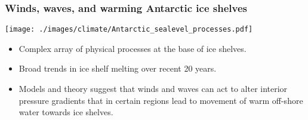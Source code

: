 \documentclass[10pt]{beamer}
\begin{document}
\begin{frame}
  \frametitle{Winds, waves, and warming Antarctic ice shelves}


\begin{center}
\vspace{-.35cm}
{\texttt{[image: ./images/climate/Antarctic\_sealevel\_processes.pdf]}}
\vspace{-0.25cm}
\end{center}

\vspace{-0.25cm}
\begin{exampleblock}{}
\begin{itemize}
\item Complex array of physical processes at the base of ice shelves.  
\item Broad trends in ice shelf melting over recent 20 years. 
\item Models and theory suggest that winds and waves can act to alter
  interior pressure gradients that in certain regions lead to movement
  of warm off-shore water towards ice shelves.

\end{itemize}
\end{exampleblock}{}

\end{frame}
\end{document}
